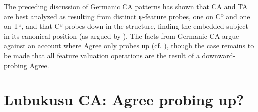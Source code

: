 







The preceding discussion of Germanic CA patterns has shown that CA and TA are best analyzed as resulting from distinct φ-feature probes, one on Cº and one on Tº, and that Cº probes down in the structure, finding the embedded subject in its canonical position (as argued by \citealt{Carstens:2003,vanKoppen:2005,Haegeman:2012}). The facts from Germanic CA argue against an account where Agree only probes up (cf. \citealt{Zeijlstra:2012,Wurmbrand:2011,Bjorkman:toappearb}), though the case remains to be made that all feature valuation operations are the result of a downward-probing Agree. 

\section{Lubukusu CA: Agree probing up?} \label{LubukusuCA}

